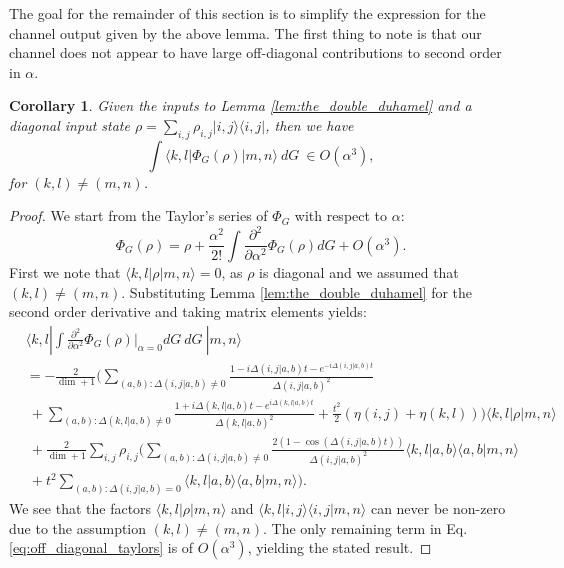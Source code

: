 \documentclass{article}
\newtheorem{corollary}[theorem]{Corollary}
\newcommand{\ket}[1]{|#1\rangle}
\newcommand{\bra}[1]{\langle #1|}
\newcommand{\braket}[2]{\langle #1|#2\rangle}
\newcommand{\ketbra}[2]{| #1\rangle\! \langle #2|}
\newcommand{\bigo}[1]{O\left( #1 \right)}
\begin{document}
The goal for the remainder of this section is to simplify the expression for the channel output given by the above lemma. The first thing to note is that our channel does not appear to have large off-diagonal contributions to second order in $\alpha$. 
\begin{corollary}
    Given the inputs to Lemma \ref{lem:the_double_duhamel} and a diagonal input state $\rho = \sum_{i,j} \rho_{i,j} \ketbra{i,j}{i,j}$, then we have $$\int \bra{k,l} \Phi_G(\rho)  \ket{m,n} ~dG~ \in \bigo{\alpha^3},$$ for $(k,l) \neq (m,n)$.
\end{corollary}
\begin{proof}
    We start from the Taylor's series of $\Phi_G$ with respect to $\alpha$:
    \begin{equation}
        \Phi_G(\rho) = \rho + \frac{\alpha^2}{2!} \int \frac{\partial^2}{\partial \alpha^2} \Phi_G(\rho) dG + \bigo{\alpha^3}. \label{eq:off_diagonal_taylors}
    \end{equation}
    First we note that $\bra{k,l}\rho \ket{m,n} =0$, as $\rho$ is diagonal and we assumed that $(k,l) \neq (m,n)$. Substituting Lemma \ref{lem:the_double_duhamel} for the second order derivative and taking matrix elements yields:
    \begin{align}
        &\bra{k,l} \int \frac{\partial^2}{\partial \alpha^2} \Phi_G(\rho)\bigg|_{\alpha = 0} dG ~dG ~\ket{m,n}  \\
     &= -\frac{2 }{\dim + 1} \bigg(\sum_{(a,b): \Delta(i,j|a,b) \neq 0} \frac{1 - i \Delta(i,j|a,b)t - e^{-i \Delta(i,j|a,b) t}}{\Delta(i,j|a,b)^2} \nonumber \\
     &~+ \sum_{(a,b): \Delta(k,l|a,b) \neq 0} \frac{1 + i \Delta(k,l|a,b) t - e^{i \Delta(k,l|a,b) t}}{\Delta(k,l|a,b)^2} + \frac{t^2}{2}(\eta(i,j) + \eta(k,l)) \bigg) \bra{k,l} \rho \ket{m,n} \nonumber \\
    &~ + \frac{2}{\dim+1}\sum_{i,j} \rho_{i,j} \bigg(\sum_{(a,b): \Delta(i,j|a,b) \neq 0 } \frac{2(1- \cos (\Delta(i,j|a,b)t))}{\Delta(i,j|a,b)^2} \braket{k,l}{a,b} \braket{a,b}{m,n} \nonumber \\
    &~ + t^2 \sum_{(a,b) : \Delta(i,j|a,b) = 0} \braket{k,l}{a,b} \braket{a,b}{m,n} \bigg).
    \end{align}
    We see that the factors $\bra{k,l}\rho \ket{m,n}$ and $\braket{k,l}{i,j} \braket{i,j}{m,n}$ can never be non-zero due to the assumption $(k,l) \neq (m,n)$. The only remaining term in Eq. \ref{eq:off_diagonal_taylors} is of $\bigo{\alpha^3}$, yielding the stated result.
\end{proof}
\end{document}
